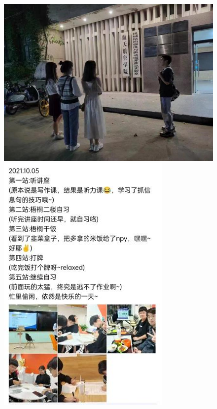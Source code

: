 \documentclass[
decoration,  %
]{qyxf-book}
\begin{document}
	\begin{figure}[h!]
		\centering
		\begin{minipage}{5cm}
		\includegraphics[]{pics/gqxjh1.png}
		\end{minipage}
		\begin{minipage}{5cm}
		\includegraphics[]{pics/gqxjh2.png}
		\end{minipage}
	\end{figure}
	
\end{document}
